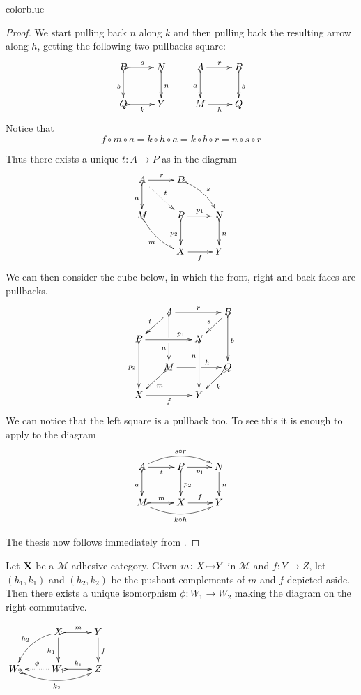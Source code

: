 \documentclass[a4paper,UKenglish,cleveref,pdftex,thm-restate,numberwithinsect,anonymous]{lipics}
\newcommand{\full}[1]{{color{blue}#1}}
\newcommand{\full}[1]{}
\newcommand{\mto}[0]{\scalebox{1}{$\rightarrowtail$}}
\def\X{\textbf {\textup{X}}}
\begin{document}
\full{ 
\begin{proof}
	We start pulling back $n$ along $k$ and then pulling back the resulting arrow along $h$, getting the following two pullbacks square:
	\[\xymatrix{B \ar@{>->}[d]_{b}\ar@{>->}[r]^{s}& N \ar@{>->}[d]^{n} & A \ar[r]^{r} \ar@{>->}[d]_{a}& B \ar@{>->}[d]^{b}\\Q\ar@{>->}[r]_{k}&Y &M \ar[r]_h&Q\\}\]
	Notice that
	\[
		f\circ m\circ a=k\circ h\circ a=k\circ b\circ r=n\circ s\circ r\]

	Thus there exists a unique $t\colon A\to P$ as in the diagram
	\[\xymatrix{A \ar@{>->}[d]_{a} \ar@{.>}[dr]^{t}\ar[r]^{r} &B \ar@{>->}@/^.2cm/[dr]^{s} \\ M \ar@{>->}@/_.2cm/[dr]_{m}&P\ar[r]^{p_1}  \ar@{>->}[d]_{p_2}& N \ar@{>->}[d]^{n}\\ &X \ar[r]_{f} & Y}\]
	We can then consider the cube below, in which the front, right and back faces are pullbacks.
	\[\xymatrix@C=15pt@R=15pt{&A\ar@{>->}[dd]|\hole_(.65){a}\ar[rr]^{r} \ar[dl]_{t} && B \ar@{>->}[dd]^{b} \ar[dl]_{s} \\ P  \ar@{>->}[dd]_{p_2}\ar[rr]^(.7){p_1} & & N \ar@{>->}[dd]_(.3){n}\\&M\ar[rr]|\hole^(.65){h} \ar@{>->}[dl]^{m} && Q \ar@{>->}[dl]^{k} \\X \ar[rr]_{f} & & Y}\]
	We can notice that the left square is a pullback too. To see this it is enough to apply \Cref{lem:pb1} to the diagram
	\[\xymatrix{A  \ar@/^.4cm/[rr]^{s\circ r}\ar@{>->}[d]_{a} \ar[r]_{t}& \ar[r]_{p_1} P \ar@{>->}[d]^{p_2}& N \ar[d]^{n}\\ M \ar@/_.4cm/[rr]_{k\circ h}\ar@{>->}[r]^{m}& X \ar[r]^{f}& Y}\]

	The thesis now follows immediately from \Cref{lem:varie}. \qedhere
\end{proof}
}
\noindent
\parbox{10cm}{
	\begin{corollary}\label{lem:pocomp}
		Let $\X$ be a $\mathcal{M}$-adhesive category. Given $m\colon X\mto Y$ in $\mathcal{M}$ and $f\colon Y\to Z$, let $(h_1, k_1)$ and $(h_2, k_2)$ be the pushout complements of $m$  and $f$ depicted aside. Then there exists a unique isomorphism $\phi\colon W_1\to W_2$ making the diagram on the right commutative.
	\end{corollary}}
\parbox{3cm}{\vspace{1em}$\xymatrix{&X \ar@{>->}[r]^{m} \ar[d]_{h_1} \ar@/_.3cm/[dl]_{h_2}& Y \ar[d]^{f} \\ W_2 \ar@{>->}@/_.4cm/[rr]_{k_2} &W_1 \ar@{.>}[l]_{\phi} \ar@{>->}[r]^{k_1} & Z }$}
\end{document}
